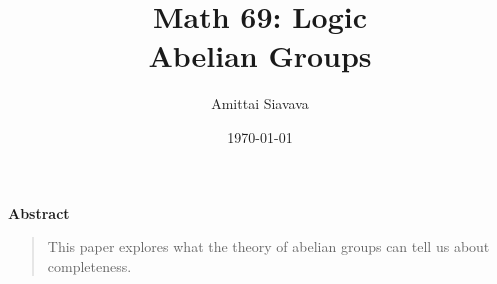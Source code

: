 \title{
  \Huge{Math 69: Logic}\\
  Abelian Groups
}
\date{\Large{\today}}

\begin{titlingpage}

  \author{\Large{Amittai Siavava}}
  \maketitle

  \step
  \begin{center}
    \textbf{Abstract}
  \end{center}
  \step
  \begin{quote}
    \small
    This paper explores what the theory of abelian groups can tell us
    about completeness.
  \end{quote}
\end{titlingpage}
